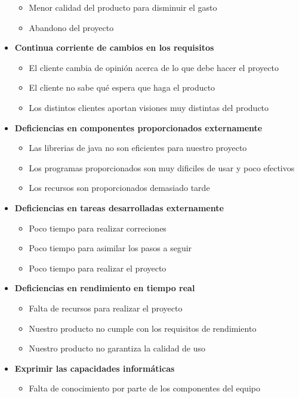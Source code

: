 \documentclass[spanish,a4paper,12pt]{report}	%
\begin{document}
\begin{itemize}
\begin{itemize}
		\item {Menor calidad del producto para disminuir el gasto}
		\item {Abandono del proyecto}
	\end{itemize}
\item \textbf {Continua corriente de cambios en los requisitos}
	\begin{itemize}
		\item {El cliente cambia de opinión acerca de lo que debe hacer el proyecto}
		\item {El cliente no sabe qué espera que haga el producto}
		\item {Los distintos clientes aportan visiones muy distintas del producto}

	\end{itemize}
\item \textbf {Deficiencias en componentes proporcionados externamente}
	\begin{itemize}
		\item {Las librerias de java no son eficientes para nuestro proyecto}
		\item {Los programas proporcionados son muy dificiles de usar y poco efectivos}
		\item {Los recursos son proporcionados demasiado tarde}

	\end{itemize}
\item \textbf {Deficiencias en tareas desarrolladas externamente}
	\begin{itemize}
		\item {Poco tiempo para realizar correciones}
		\item {Poco tiempo para asimilar los pasos a seguir}
		\item {Poco tiempo para realizar el proyecto}
	\end{itemize}
\item \textbf {Deficiencias en rendimiento en tiempo real}
	\begin{itemize}
		\item {Falta de recursos para realizar el proyecto}
		\item {Nuestro producto no cumple con los requisitos de rendimiento}
		\item {Nuestro producto no garantiza la calidad de uso}
	\end{itemize}
\item \textbf {Exprimir las capacidades informáticas}
	\begin{itemize}
		\item {Falta de conocimiento por parte de los componentes del equipo}
	\end{itemize}
\end{itemize}
\end{document}
